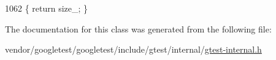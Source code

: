 \begin{DoxyCode}
1062 \{ \textcolor{keywordflow}{return} size\_; \}
\end{DoxyCode}


The documentation for this class was generated from the following file\+:\begin{DoxyCompactItemize}
\item 
vendor/googletest/googletest/include/gtest/internal/\hyperlink{gtest-internal_8h}{gtest-\/internal.\+h}\end{DoxyCompactItemize}
